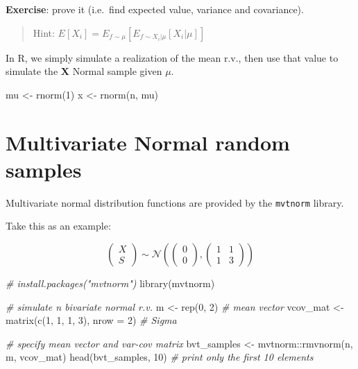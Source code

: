 \documentclass[
  oneside]{book}
\newenvironment{Shaded}{\begin{snugshade}}{\end{snugshade}}
\newcommand{\AttributeTok}[1]{\textcolor[rgb]{0.77,0.63,0.00}{#1}}
\newcommand{\CommentTok}[1]{\textcolor[rgb]{0.56,0.35,0.01}{\textit{#1}}}
\newcommand{\DecValTok}[1]{\textcolor[rgb]{0.00,0.00,0.81}{#1}}
\newcommand{\FunctionTok}[1]{\textcolor[rgb]{0.00,0.00,0.00}{#1}}
\newcommand{\NormalTok}[1]{#1}
\newcommand{\OtherTok}[1]{\textcolor[rgb]{0.56,0.35,0.01}{#1}}
\newcommand{\SpecialCharTok}[1]{\textcolor[rgb]{0.00,0.00,0.00}{#1}}
\begin{document}
\textbf{Exercise}: prove it (i.e.~find expected value, variance and covariance).

\begin{quote}
Hint: \(E[X_i] = E_{f\sim \mu}[E_{f\sim X_i | \mu}[X_i | \mu]]\)
\end{quote}

In R, we simply simulate a realization of the mean r.v., then
use that value to simulate the \(\mathbf X\) Normal sample given \(\mu\).

\begin{Shaded}
\begin{Highlighting}[]
\NormalTok{mu }\OtherTok{\textless{}{-}} \FunctionTok{rnorm}\NormalTok{(}\DecValTok{1}\NormalTok{)}
\NormalTok{x }\OtherTok{\textless{}{-}} \FunctionTok{rnorm}\NormalTok{(n, mu)}
\end{Highlighting}
\end{Shaded}

\hypertarget{multivariate-normal-random-samples}{%
\section{Multivariate Normal random samples}\label{multivariate-normal-random-samples}}

Multivariate normal distribution functions are provided by the \texttt{mvtnorm} library.

Take this as an example:

\[
\begin{pmatrix} X \\ S \end{pmatrix} \sim
\mathcal{N} \left(
\begin{pmatrix}
0 \\ 0
\end{pmatrix},
\begin{pmatrix}
1 & 1 \\ 1 & 3
\end{pmatrix}
\right)
\]

\begin{Shaded}
\begin{Highlighting}[]
\CommentTok{\# install.packages("mvtnorm")}
\FunctionTok{library}\NormalTok{(mvtnorm)}

\CommentTok{\# simulate n bivariate normal r.v.}
\NormalTok{m }\OtherTok{\textless{}{-}} \FunctionTok{rep}\NormalTok{(}\DecValTok{0}\NormalTok{, }\DecValTok{2}\NormalTok{) }\CommentTok{\# mean vector}
\NormalTok{vcov\_mat }\OtherTok{\textless{}{-}} \FunctionTok{matrix}\NormalTok{(}\FunctionTok{c}\NormalTok{(}\DecValTok{1}\NormalTok{, }\DecValTok{1}\NormalTok{, }\DecValTok{1}\NormalTok{, }\DecValTok{3}\NormalTok{), }\AttributeTok{nrow =} \DecValTok{2}\NormalTok{) }\CommentTok{\# Sigma}

\CommentTok{\# specify mean vector and var{-}cov matrix}
\NormalTok{bvt\_samples }\OtherTok{\textless{}{-}}\NormalTok{ mvtnorm}\SpecialCharTok{::}\FunctionTok{rmvnorm}\NormalTok{(n, m, vcov\_mat)}
\FunctionTok{head}\NormalTok{(bvt\_samples, }\DecValTok{10}\NormalTok{) }\CommentTok{\# print only the first 10 elements}
\end{Highlighting}
\end{Shaded}
\end{document}
